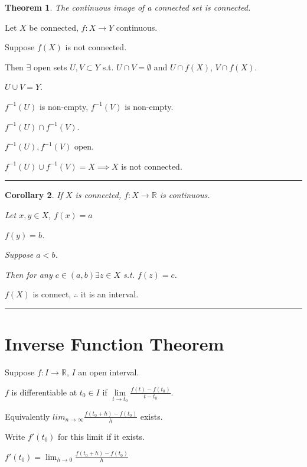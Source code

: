 \documentclass[twoside]{article}
\newcounter{lecnum}
\newtheorem{theorem}{Theorem}[lecnum]
\newtheorem{corollary}[theorem]{Corollary}
\newenvironment{proof}{{\bf Proof:}}{\hfill\rule{2mm}{2mm}}
\newcommand\R{\mathbb{R}}
\begin{document}
    \begin{theorem}
        The continuous image of a connected set is connected.
    \end{theorem}

    \begin{proof}
        Let $X$ be connected, $f: X \rightarrow Y$ continuous. 

        Suppose $f(X)$ is not connected. 

        Then $\exists$ open sets $U, V \subset Y$ s.t. $U \cap V = \emptyset$ and $U \cap f(X)$, $V \cap f(X)$.

        $U \cup V = Y$. 

        $f^{-1}(U)$ is non-empty, $f^{-1}(V)$ is non-empty.
        
        $f^{-1}(U) \cap f^{-1}(V)$. 

        $f^{-1}(U),f^{-1}(V)$ open.

        $f^{-1}(U) \cup f^{-1}(V) = X \implies X$ is not connected.  
    \end{proof}

    \begin{corollary}
        If $X$ is connected, $f: X \rightarrow \R$ is continuous. 

        Let $x, y \in X$, $f(x) =a$

        $f(y) = b$. 

        Suppose $a < b$.

        Then for any $c \in (a,b) \exists z \in X$ s.t. $f(z) = c$. 
    \end{corollary}

    \begin{proof}
        $f(X)$ is connect, $\therefore$ it is an interval. 
    \end{proof}

    \section{Inverse Function Theorem}

    Suppose $f: I \rightarrow \R$, $I$ an open interval. 

    $f$ is differentiable at $t_0 \in I$ if $\underset{t\rightarrow t_0}\lim\frac{f(t) - f(t_0)}{t-t_0}$. 

    Equivalently $lim_{n\rightarrow \infty} \frac{f(t_0 + h) - f(t_0)}{h}$ exists. 

    Write $f'(t_0)$ for this limit if it exists.
    
    $f'(t_0) = \lim_{h \rightarrow 0}\frac{f(t_0 + h) - f(t_0)}{h}$
\end{document}
